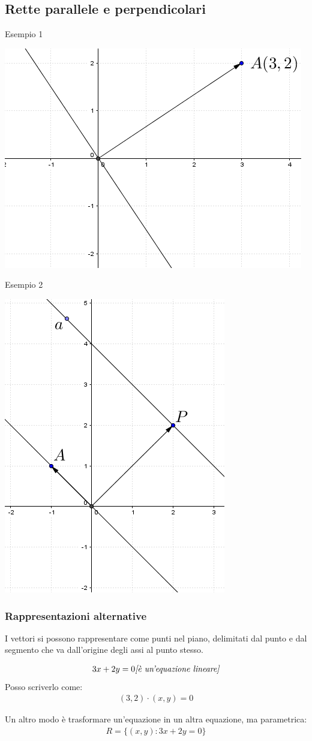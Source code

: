 \documentclass[italian]{article}
\begin{document}
\subsection{Rette parallele e perpendicolari}
Esempio 1
\begin{center}
	\includegraphics[width=0.5\linewidth]{img/vettori_rette_0.png} 
\end{center}
Esempio 2
\begin{center} 
	\includegraphics[width=0.4\linewidth]{img/vettori_rette_1.png}
\end{center}
\pagebreak
\subsubsection{Rappresentazioni alternative}
I vettori si possono rappresentare come punti nel piano, delimitati dal punto e dal segmento che va dall'origine degli assi al punto stesso.


\begin{gather*}
	3x+2y=0 \emph{[è un'equazione lineare]}
\end{gather*}
Posso scriverlo come: 
\begin{gather*}
	(3,2)\cdot(x,y)=0
\end{gather*}


Un altro modo è trasformare un'equazione in un altra equazione, ma parametrica:
\begin{gather*}
	R=\{(x,y):3x+2y=0\}
\end{gather*}
\end{document}
